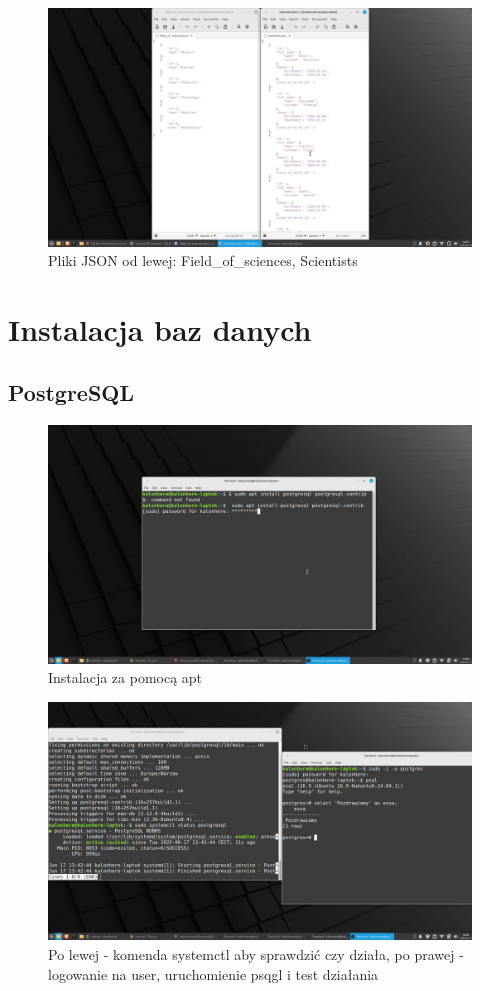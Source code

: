 \documentclass[11pt]{article}
\begin{document}
\newpage
		\begin{figure}[!ht]
			\includegraphics[width=\textwidth]{JSON_examples_2.png}
			\caption{Pliki JSON od lewej: Field\_of\_sciences, Scientists}
		\end{figure}
\section{Instalacja baz danych}
	\subsection{PostgreSQL}
		\begin{figure}[!ht]
			\includegraphics[width=\textwidth]{1_instalacja_postgresa.png}
			\caption{Instalacja za pomocą apt}
		\end{figure}
		\begin{figure}[!ht]
			\includegraphics[width=\textwidth]{2_sprawdzenie_postgresa_i_psql.png}
			\caption{Po lewej - komenda systemctl aby sprawdzić czy działa, po prawej - logowanie na user, uruchomienie psqgl i test działania}
		\end{figure}
\end{document}
